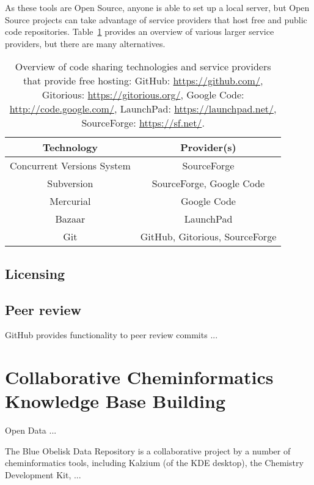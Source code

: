 \documentclass[12pt]{book}
\begin{document}
As these tools are Open Source, anyone is able to set up a local server, but
Open Source projects can take advantage of service providers that host
free and public code repositories. Table~\ref{tab:cvsProviders}
provides an overview of various larger service providers, but there
are many alternatives.

\begin{table}
\caption{Overview of code sharing technologies and service providers
that provide free hosting:
GitHub: \url{https://github.com/},
Gitorious: \url{https://gitorious.org/},
Google Code: \url{http://code.google.com/},
LaunchPad: \url{https://launchpad.net/},
SourceForge: \url{https://sf.net/}.
}
\label{tab:cvsProviders}
\begin{tabular}{|c|c|}
\hline Technology & Provider(s) \\ 
\hline Concurrent Versions System &  SourceForge \\ 
\hline Subversion & SourceForge, Google Code \\ 
\hline Mercurial & Google Code \\ 
\hline Bazaar & LaunchPad \\ 
\hline Git & GitHub, Gitorious, SourceForge \\ 
\end{tabular} 
\end{table}

\subsection{Licensing}



\subsection{Peer review}

GitHub provides functionality to peer review commits ...


\section{Collaborative Cheminformatics Knowledge Base Building}

Open Data ...

The Blue Obelisk Data Repository is a collaborative project by a number
of cheminformatics tools, including Kalzium (of the KDE desktop), the
Chemistry Development Kit, ...
\end{document}

